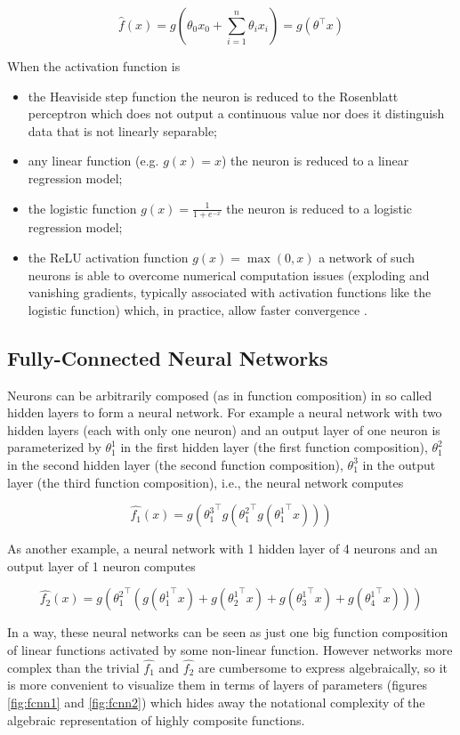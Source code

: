 $$
\hat{f}(x) = g(\theta_0 x_0 + \sum_{i=1}^{n}{\theta_i x_i}) = g(\theta^{\top} x)
$$

When the activation function is

\begin{itemize}
    \item the Heaviside step function the neuron is reduced to the Rosenblatt perceptron \cite{perceptron} which does not output a continuous value nor does it distinguish data that is not linearly separable;
    \item any linear function (e.g. $g(x) = x$) the neuron is reduced to a linear regression model;
    \item the logistic function $g(x) = \frac{1}{1 + e^{-x}}$ the neuron is reduced to a logistic regression model;
    \item the ReLU activation function $g(x) = \max(0, x)$ a network of such neurons is able to overcome numerical computation issues (exploding and vanishing gradients, typically associated with activation functions like the logistic function) which, in practice, allow faster convergence \cite{alexnet}.
\end{itemize}

\subsection{Fully-Connected Neural Networks}

Neurons can be arbitrarily composed (as in function composition) in so called hidden layers to form a neural network. For example a neural network with two hidden layers (each with only one neuron) and an output layer of one neuron is parameterized by $\theta^1_1$ in the first hidden layer (the first function composition), $\theta^2_1$ in the second hidden layer (the second function composition), $\theta^3_1$ in the output layer (the third function composition), i.e., the neural network computes

$$
\hat{f_1}(x) = g({\theta^3_1}^{\top} g({\theta^2_1}^{\top} g({\theta^1_1}^{\top} x)))
$$


As another example, a neural network with 1 hidden layer of 4 neurons and an output layer of 1 neuron computes

$$
\hat{f_2}(x) = g({\theta^2_1}^{\top} (g({\theta^1_1}^{\top} x) + g({\theta^1_2}^{\top} x) + g({\theta^1_3}^{\top} x) + g({\theta^1_4}^{\top} x)))
$$

In a way, these neural networks can be seen as just one big function composition of linear functions activated by some non-linear function. However networks more complex than the trivial $\hat{f_1}$ and $\hat{f_2}$ are cumbersome to express algebraically, so it is more convenient to visualize them in terms of layers of parameters (figures \ref{fig:fcnn1} and \ref{fig:fcnn2}) which hides away the notational complexity of the algebraic representation of highly composite functions.

